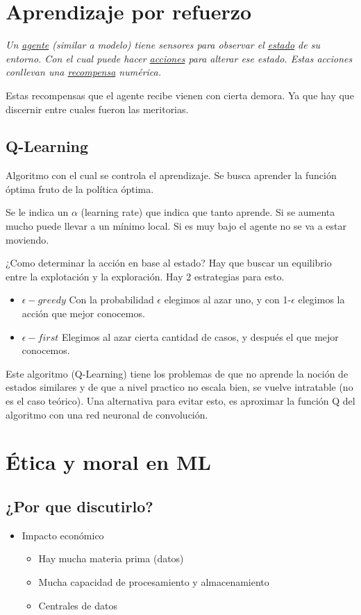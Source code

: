 \documentclass[titlepage,a4paper]{article}
\begin{document}
\section{Aprendizaje por refuerzo}
\textit{
Un \underline{agente} (similar a modelo) tiene sensores para observar el \underline{estado} de su entorno. Con el cual puede hacer \underline{acciones} para alterar ese estado. Estas acciones conllevan una \underline{recompensa} numérica.
}


Estas recompensas que el agente recibe vienen con cierta demora. Ya que hay que discernir entre cuales fueron las meritorias.


\subsection{Q-Learning}
Algoritmo con el cual se controla el aprendizaje. Se busca aprender la función óptima fruto de la política óptima.

Se le indica un $\alpha$ (learning rate) que indica que tanto aprende. Si se aumenta mucho puede llevar a un mínimo local. Si es muy bajo el agente no se va a estar moviendo.

¿Como determinar la acción en base al estado? Hay que buscar un equilibrio entre la explotación y la exploración. Hay 2 estrategias para esto.

\begin{itemize} %
    \item $\epsilon-greedy$ Con la probabilidad $\epsilon$ elegimos al azar uno, y con 1-$\epsilon$ elegimos la acción que mejor conocemos.
    \item $\epsilon-first$ Elegimos al azar cierta cantidad de casos, y después el que mejor conocemos. 
\end{itemize}

Este algoritmo (Q-Learning) tiene los problemas de que no aprende la noción de estados similares y de que a nivel practico no escala bien, se vuelve intratable (no es el caso teórico). Una alternativa para evitar esto, es aproximar la función Q del algoritmo con una red neuronal de convolución.

\section{Ética y moral en ML}
\subsection{¿Por que discutirlo?}
\begin{itemize}
    \item Impacto económico
    \begin{itemize}
        \item Hay mucha materia prima (datos)
        \item Mucha capacidad de procesamiento y almacenamiento
        \item Centrales de datos
    \end{itemize}
\end{itemize}
\end{document}
